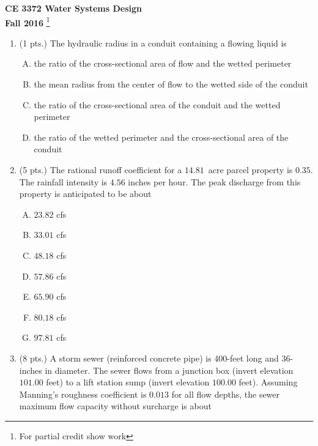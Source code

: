 \documentclass[11pt]{article}
\begin{document}
\begingroup
\begin{center}
{\textbf{{ CE 3372 Water Systems Design}  \\ Fall 2016} \footnote{For partial credit show work}
}
\end{center}
\endgroup


\begin{enumerate}
\item  (1 pts.)
The hydraulic radius in a conduit containing a flowing liquid is
\begin{enumerate} [(A)]
\item	the ratio of the cross-sectional area of flow and the wetted perimeter
\item	the mean radius from the center of flow to the wetted side of the conduit
\item	the ratio of the cross-sectional area of the conduit and the wetted perimeter
\item	the ratio of the wetted perimeter and the cross-sectional area of the conduit
\end{enumerate}
\item (5 pts.)
The rational runoff coefficient for a $14.81$~acre parcel property is $0.35$.  
The rainfall intensity is $4.56$ inches per hour.  
The peak discharge from this property is anticipated to be about
\begin{enumerate} [(A)]
\item $23.82$ cfs
\item $33.01$ cfs
\item $48.18$ cfs
\item $57.86$ cfs
\item $65.90$ cfs
\item $80.18$ cfs
\item $97.81$ cfs
\end{enumerate}
\item  (8 pts.)
A storm sewer (reinforced concrete pipe) is 400-feet long and 36-inches in diameter.  The sewer flows from a junction box (invert elevation $101.00$ feet) to a lift station sump (invert elevation $100.00$ feet).  Assuming Manning's roughness coefficient is $0.013$ for all flow depths, the sewer maximum flow capacity without surcharge is about%

\end{enumerate}
\end{document}
